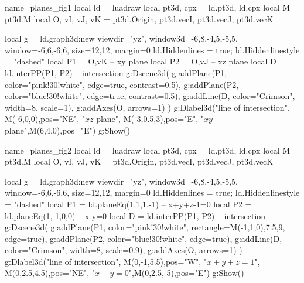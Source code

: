 \documentclass[border=5pt]{standalone}%
\begin{document}
\begin{luadraw}{name=planes_fig1}
local ld = luadraw
local pt3d, cpx = ld.pt3d, ld.cpx
local M = pt3d.M
local O, vI, vJ, vK = pt3d.Origin, pt3d.vecI, pt3d.vecJ, pt3d.vecK

local g = ld.graph3d:new{ viewdir="yz", window3d={-6,8,-4,5,-5,5}, 
    window={-6,6,-6,6}, size={12,12}, margin=0 }
ld.Hiddenlines = true; ld.Hiddenlinestyle = "dashed"
local P1 = {O,vK} -- xy plane
local P2 = {O,vJ} -- xz plane
local D = ld.interPP(P1, P2) -- intersection
g:Dscene3d(
    g:addPlane(P1, {color="pink!30!white", edge=true, contrast=0.5}),
    g:addPlane(P2, {color="blue!30!white", edge=true, contrast=0.5}),
    g:addLine(D, {color="Crimson", width=8, scale=1}),
    g:addAxes(O, {arrows=1})
    )
g:Dlabel3d("{line of intersection}", M(-6,0,0),{pos="NE"},
    "$xz$-plane", M(-3,0.5,3),{pos="E"}, "$xy$-plane",M(6,4,0),{pos="E"})
g:Show()
\end{luadraw}

\begin{luadraw}{name=planes_fig2}
local ld = luadraw
local pt3d, cpx = ld.pt3d, ld.cpx
local M = pt3d.M
local O, vI, vJ, vK = pt3d.Origin, pt3d.vecI, pt3d.vecJ, pt3d.vecK

local g = ld.graph3d:new{ viewdir="yz", window3d={-6,8,-4,5,-5,5}, 
    window={-6,6,-6,6}, size={12,12}, margin=0 }
ld.Hiddenlines = true; ld.Hiddenlinestyle = "dashed"
local P1 = ld.planeEq(1,1,1,-1) -- x+y+z-1=0
local P2 = ld.planeEq(1,-1,0,0) -- x-y=0
local D = ld.interPP(P1, P2) -- intersection
g:Dscene3d(
    g:addPlane(P1, {color="pink!30!white", rectangle={M(-1,1,0),7.5,9}, edge=true}),
    g:addPlane(P2, {color="blue!30!white", edge=true}),
    g:addLine(D, {color="Crimson", width=8, scale=0.9}),
    g:addAxes(O, {arrows=1})
    )
g:Dlabel3d("{line of intersection}", M(0,-1,5.5),{pos="W"},
    "$x+y+z=1$", M(0,2.5,4.5),{pos="NE"}, "$x-y=0$",M(0,2.5,-5),{pos="E"})
g:Show()
\end{luadraw}
\end{document}
